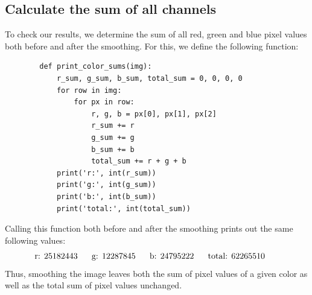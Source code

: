 \subsection{Calculate the sum of all channels}
    To check our results, we determine the sum of all red, green 
    and blue pixel values both before and after the smoothing.
    For this, we define the following function:
    \begin{lstlisting}
        def print_color_sums(img):
            r_sum, g_sum, b_sum, total_sum = 0, 0, 0, 0
            for row in img:
                for px in row:
                    r, g, b = px[0], px[1], px[2]
                    r_sum += r
                    g_sum += g
                    b_sum += b
                    total_sum += r + g + b
            print('r:', int(r_sum))
            print('g:', int(g_sum))
            print('b:', int(b_sum))
            print('total:', int(total_sum))\end{lstlisting}
    Calling this function both before and after the smoothing prints out
    the same following values: \\
    $$
        \textnormal{r: 25182443} \ \ \ \ \
        \textnormal{g: 12287845} \ \ \ \ \
        \textnormal{b: 24795222} \ \ \ \ \
        \textnormal{total: 62265510} \ \ \ \ \
    $$
    Thus, smoothing the image leaves both the sum of pixel values of a 
    given color as well as the total sum of pixel values unchanged.
